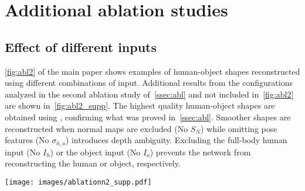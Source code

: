 \section{Additional ablation studies}
\label{sec:abl_suppl}
\subsection{Effect of different inputs}
\cref{fig:abl2} of the main paper shows examples of human-object shapes reconstructed using different combinations of input. Additional results from the configurations analyzed in the second ablation study of~\cref{ssec:abl} and not included in~\cref{fig:abl2} are shown in~\cref{fig:abl2_supp}. 
%
The highest quality human-object shapes are obtained using \name, confirming what was proved in~\cref{ssec:abl}. Smoother shapes are reconstructed when normal maps are excluded (No $S_N$) while omitting pose features (No $\sigma_{{h,o}}$) introduces depth ambiguity. Excluding the full-body human input (No $I_h$) or the object input (No $I_o$) prevents the network from reconstructing the human or object, respectively.
%
\begin{figure*}[b]
  \centering
\texttt{[image: images/ablationn2\_supp.pdf]}
\vspace{-6mm}
\caption{Qualitative results showing the effect of using different configurations of the attention-based neural implicit model with methods that have not been shown in~\cref{fig:abl2} of the main paper. Front and side views are shown from \dataname in the top row, from BEHAVE~\cite{bhatnagar2022behave} in the bottom.}
\label{fig:abl2_supp}
\end{figure*}
